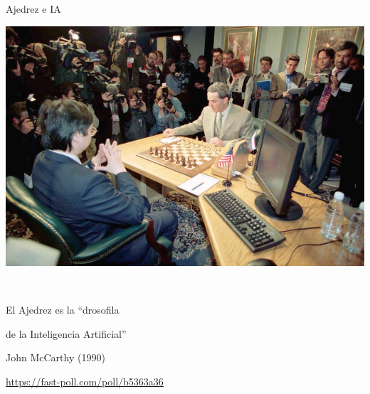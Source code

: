 \documentclass[11pt]{beamer}
\begin{document}
\begin{frame}{Ajedrez e IA}

\begin{minipage}{0.5\linewidth}
\includegraphics[scale=0.1]{imagenes/kasparov_vs_deep_blue}

\

El Ajedrez es la ``drosofila\par de la Inteligencia Artificial''

\begin{flushright}
John McCarthy (1990)
\end{flushright}

\begin{tiny}
\url{https://fast-poll.com/poll/b5363a36}
\end{tiny}

\end{minipage}\begin{minipage}{0.5\linewidth}

\vspace*{-2\baselineskip}



\end{minipage}
\end{frame}
\end{document}

